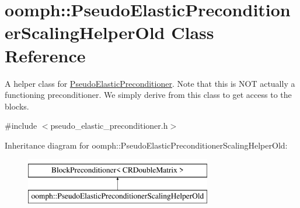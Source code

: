 \hypertarget{classoomph_1_1PseudoElasticPreconditionerScalingHelperOld}{}\section{oomph\+:\+:Pseudo\+Elastic\+Preconditioner\+Scaling\+Helper\+Old Class Reference}
\label{classoomph_1_1PseudoElasticPreconditionerScalingHelperOld}


A helper class for \hyperlink{classoomph_1_1PseudoElasticPreconditioner}{Pseudo\+Elastic\+Preconditioner}. Note that this is N\+OT actually a functioning preconditioner. We simply derive from this class to get access to the blocks.  




{\ttfamily \#include $<$pseudo\+\_\+elastic\+\_\+preconditioner.\+h$>$}

Inheritance diagram for oomph\+:\+:Pseudo\+Elastic\+Preconditioner\+Scaling\+Helper\+Old\+:\begin{figure}[H]
\begin{center}
\leavevmode
\includegraphics[height=2.000000cm]{classoomph_1_1PseudoElasticPreconditionerScalingHelperOld}
\end{center}
\end{figure}
